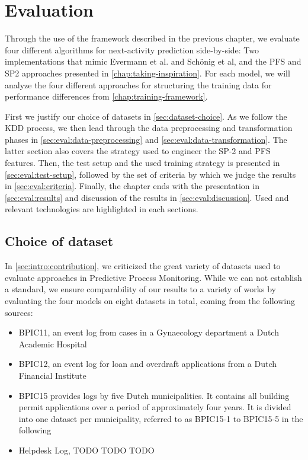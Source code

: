 \chapter{Evaluation}\label{chap:evaluation}
Through the use of the framework described in the previous chapter, we evaluate four different algorithms for next-activity prediction side-by-side: Two implementations that mimic Evermann et al. and Schönig et al, and the PFS and SP2 approaches presented in \autoref{chap:taking-inspiration}. For each model, we will analyze the four different approaches for structuring the training data for performance differences from \autoref{chap:training-framework}.

First we justify our choice of datasets in \autoref{sec:dataset-choice}. As we follow the KDD process, we then lead through the data preprocessing and transformation phases in \autoref{sec:eval:data-preprocessing} and \autoref{sec:eval:data-transformation}. The latter section also covers the strategy used to engineer the SP-2 and PFS features. Then, the test setup and the used training strategy is presented in \autoref{sec:eval:test-setup}, followed by the set of criteria by which we judge the results in \autoref{sec:eval:criteria}. Finally, the chapter ends with the presentation in \autoref{sec:eval:results} and discussion of the results in \autoref{sec:eval:discussion}. Used and relevant technologies are highlighted in each sections.

\section{Choice of dataset}
\label{sec:dataset-choice}
In \autoref{sec:intro:contribution}, we criticized the great variety of datasets used to evaluate approaches in Predictive Process Monitoring. While we can not establish a standard, we ensure comparability of our results to a variety of works by evaluating the four models on eight datasets in total, coming from the following sources:

\begin{itemize}
    \item BPIC11, an event log from cases in a Gynaecology department a Dutch Academic Hospital~\cite{BPIC2011}
    \item BPIC12, an event log for loan and overdraft applications from a Dutch Financial Institute~\cite{BPIC2012}
    \item BPIC15 provides logs by five Dutch municipalities. It contains all building permit applications over a period of approximately four years. It is divided into one dataset per municipality, referred to as BPIC15-1 to BPIC15-5 in the following~\cite{BPIC2015}
    \item Helpdesk Log, TODO TODO TODO
\end{itemize}

